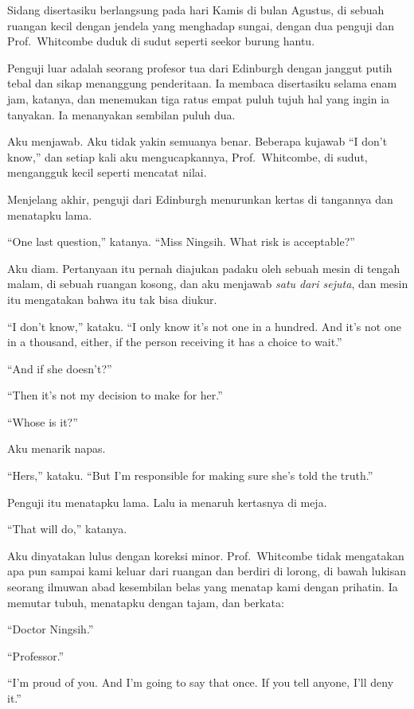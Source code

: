 \documentclass[11pt,twoside,openany]{book}
\makeatletter
\newcommand{\scenebreak}{\par\vspace{0.9em}{\centering\textsc{*\hspace{0.7em}*\hspace{0.7em}*}\par}\vspace{0.9em}\@afterindentfalse\@afterheading}
\makeatother
\begin{document}
\scenebreak
Sidang disertasiku berlangsung pada hari Kamis di bulan Agustus, di sebuah ruangan kecil dengan jendela yang menghadap sungai, dengan dua penguji dan Prof.~Whitcombe duduk di sudut seperti seekor burung hantu.

Penguji luar adalah seorang profesor tua dari Edinburgh dengan janggut putih tebal dan sikap menanggung penderitaan. Ia membaca disertasiku selama enam jam, katanya, dan menemukan tiga ratus empat puluh tujuh hal yang ingin ia tanyakan. Ia menanyakan sembilan puluh dua.

Aku menjawab. Aku tidak yakin semuanya benar. Beberapa kujawab ``I don't know,'' dan setiap kali aku mengucapkannya, Prof.~Whitcombe, di sudut, mengangguk kecil seperti mencatat nilai.

Menjelang akhir, penguji dari Edinburgh menurunkan kertas di tangannya dan menatapku lama.

``One last question,'' katanya. ``Miss Ningsih. What risk is acceptable?''

Aku diam. Pertanyaan itu pernah diajukan padaku oleh sebuah mesin di tengah malam, di sebuah ruangan kosong, dan aku menjawab \emph{satu dari sejuta}, dan mesin itu mengatakan bahwa itu tak bisa diukur.

``I don't know,'' kataku. ``I only know it's not one in a hundred. And it's not one in a thousand, either, if the person receiving it has a choice to wait.''

``And if she doesn't?''

``Then it's not my decision to make for her.''

``Whose is it?''

Aku menarik napas.

``Hers,'' kataku. ``But I'm responsible for making sure she's told the truth.''

Penguji itu menatapku lama. Lalu ia menaruh kertasnya di meja.

``That will do,'' katanya.

Aku dinyatakan lulus dengan koreksi minor. Prof.~Whitcombe tidak mengatakan apa pun sampai kami keluar dari ruangan dan berdiri di lorong, di bawah lukisan seorang ilmuwan abad kesembilan belas yang menatap kami dengan prihatin. Ia memutar tubuh, menatapku dengan tajam, dan berkata:

``Doctor Ningsih.''

``Professor.''

``I'm proud of you. And I'm going to say that once. If you tell anyone, I'll deny it.''
\end{document}
